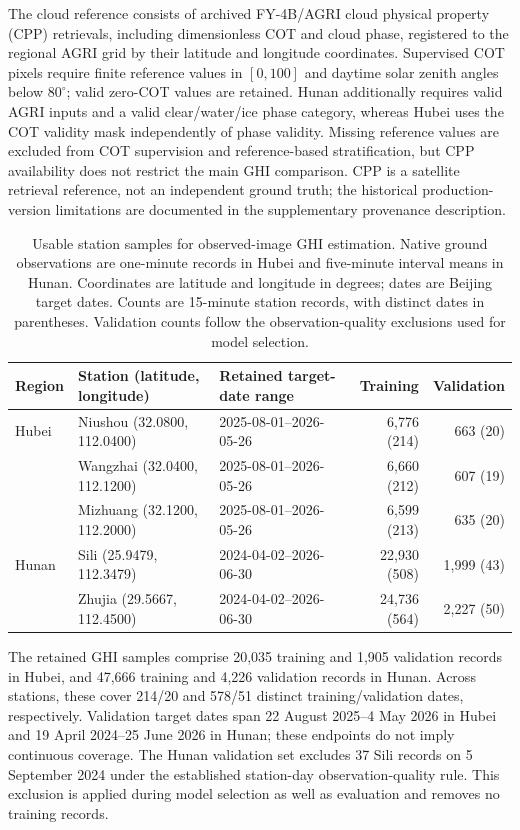 \documentclass[11pt]{article}
\begin{document}
The cloud reference consists of archived FY-4B/AGRI cloud physical property (CPP) retrievals, including dimensionless COT and cloud phase, registered to the regional AGRI grid by their latitude and longitude coordinates. Supervised COT pixels require finite reference values in $[0,100]$ and daytime solar zenith angles below $80^\circ$; valid zero-COT values are retained. Hunan additionally requires valid AGRI inputs and a valid clear/water/ice phase category, whereas Hubei uses the COT validity mask independently of phase validity. Missing reference values are excluded from COT supervision and reference-based stratification, but CPP availability does not restrict the main GHI comparison. CPP is a satellite retrieval reference, not an independent ground truth; the historical production-version limitations are documented in the supplementary provenance description.

\begin{table}[!htbp]\centering\small
\caption{Usable station samples for observed-image GHI estimation. Native ground observations are one-minute records in Hubei and five-minute interval means in Hunan. Coordinates are latitude and longitude in degrees; dates are Beijing target dates. Counts are 15-minute station records, with distinct dates in parentheses. Validation counts follow the observation-quality exclusions used for model selection.}\label{tab:data}
\begin{tabularx}{\linewidth}{llXrr}\toprule
Region & Station (latitude, longitude) & Retained target-date range & Training & Validation\\\midrule
Hubei & Niushou (32.0800, 112.0400) & 2025-08-01--2026-05-26 & 6,776 (214) & 663 (20)\\
 & Wangzhai (32.0400, 112.1200) & 2025-08-01--2026-05-26 & 6,660 (212) & 607 (19)\\
 & Mizhuang (32.1200, 112.2000) & 2025-08-01--2026-05-26 & 6,599 (213) & 635 (20)\\
Hunan & Sili (25.9479, 112.3479) & 2024-04-02--2026-06-30 & 22,930 (508) & 1,999 (43)\\
 & Zhujia (29.5667, 112.4500) & 2024-04-02--2026-06-30 & 24,736 (564) & 2,227 (50)\\\bottomrule
\end{tabularx}
\end{table}

The retained GHI samples comprise 20,035 training and 1,905 validation records in Hubei, and 47,666 training and 4,226 validation records in Hunan. Across stations, these cover 214/20 and 578/51 distinct training/validation dates, respectively. Validation target dates span 22 August 2025--4 May 2026 in Hubei and 19 April 2024--25 June 2026 in Hunan; these endpoints do not imply continuous coverage. The Hunan validation set excludes 37 Sili records on 5 September 2024 under the established station-day observation-quality rule. This exclusion is applied during model selection as well as evaluation and removes no training records.
\end{document}
